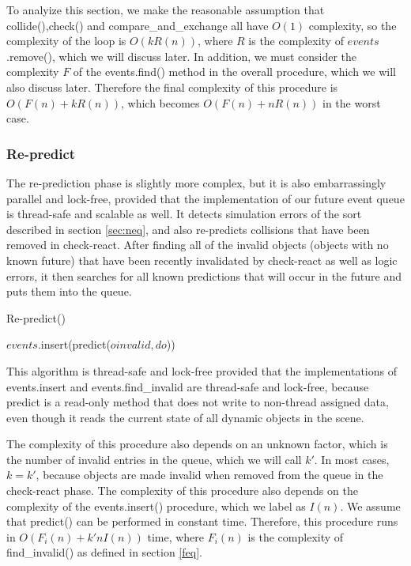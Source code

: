 \documentclass[conference]{IEEEtran}
\begin{document}
To analyize this section, we make the reasonable assumption that collide(),check() and compare\_and\_exchange all have $O(1)$ complexity, so the complexity
of the loop is $O(k R(n))$, where $R$ is the complexity of $events$.remove(), which we will discuss later.  In addition, we must consider the complexity $F$
of the events.find() method in the overall procedure, which we will also discuss later.  Therefore the final complexity of this procedure is $O(F(n)+k R(n))$, which
becomes $O(F(n)+n R(n))$ in the worst case.

\subsubsection{Re-predict}
\label{sec:repredict}
The re-prediction phase is slightly more complex, but it is also embarrassingly parallel and lock-free, provided that the implementation of our future event queue is thread-safe and scalable as well.  It detects simulation errors of the sort described in section \ref{sec:neq}, and also re-predicts collisions
that have been removed in check-react.  After finding all of the invalid objects (objects with no known future) that have been recently invalidated by check-react as well as logic errors, it then
searches for all known predictions that will occur in the future and puts them into the queue.  

\begin{algorithm}
\caption{Re-predict()}
\begin{algorithmic}
\STATE {}
	\STATE {}
			\STATE $events$.insert(predict($oinvalid,do$))
		\ENDFOR
	\ENDIF
\ENDFOR
\end{algorithmic}
\end{algorithm}
This algorithm is thread-safe and lock-free provided that the implementations of events.insert and events.find\_invalid are thread-safe and lock-free, because predict is a read-only method that 
does not write to non-thread assigned data, even though it reads the current state of all dynamic objects in the scene.

The complexity of this procedure also depends on an unknown factor, which is the number of invalid entries in the queue, which we will call $k'$.  In most cases, $k=k'$, because objects are made invalid
when removed from the queue in the check-react phase.
The complexity of this procedure also depends on the complexity of the events.insert() procedure, which we label as $I(n)$.  We assume that predict() can be performed in constant time.
Therefore, this procedure runs in $O(F_i(n)+k' n I(n))$ time, where $F_i(n)$ is the complexity of find\_invalid() as defined in section \ref{feq}.
\end{document}
